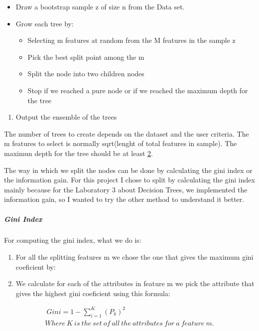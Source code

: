\documentclass[11pt]{article}
\providecommand{\tightlist}{%
      \setlength{\itemsep}{0pt}\setlength{\parskip}{0pt}}
\begin{document}
\begin{itemize}
\tightlist
\item
  Draw a bootstrap sample z of size n from the Data set.
\item
  Grow each tree by:

  \begin{itemize}
  \tightlist
  \item
    Selecting m features at random from the M features in the sample z
  \item
    Pick the best split point among the m
  \item
    Split the node into two children nodes
  \item
    Stop if we reached a pure node or if we reached the maximum depth
    for the tree
  \end{itemize}
\end{itemize}

\begin{enumerate}
\def\labelenumi{\arabic{enumi}.}
\setcounter{enumi}{1}
\tightlist
\item
  Output the ensemble of the trees
\end{enumerate}

The number of trees to create depends on the dataset and the user
criteria. The m features to select is normally sqrt(lenght of total
features in sample). The maximun depth for the tree should be at least
\href{https://web.stanford.edu/~hastie/Papers/ESLII.pdf}{2}.

The way in which we split the nodes can be done by calculating the gini
index or the information gain. For this project I chose to split by
calculating the gini index mainly because for the Laboratory 3 about
Decision Trees, we implemented the information gain, so I wanted to try
the other method to understand it better.

\subparagraph{Gini Index}\label{gini-index}

For computing the gini index, what we do is:

\begin{enumerate}
\def\labelenumi{\arabic{enumi}.}
\item
  For all the splitting features m we chose the one that gives the
  maximum gini coeficient by:
\item
  We calculate for each of the attributes in feature m we pick the
  attribute that gives the highest gini coeficient using this formula:
\end{enumerate}

\begin{align}
\ Gini = 1- \sum\limits_{i=1}^K (P_k)^2  \\
Where \ K \ is \ the \ set \ of \ all \ the \ attributes \ for \ a \ feature \ m.
\end{align}
\end{document}
